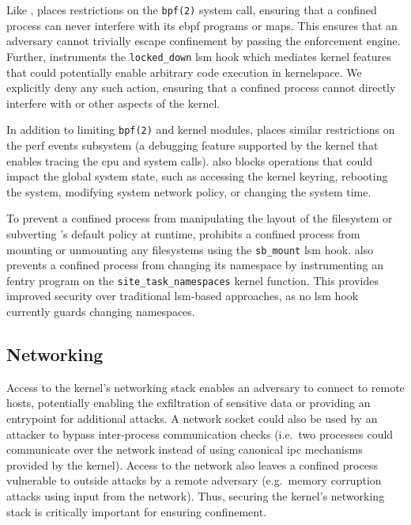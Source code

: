 Like \bpfbox{}, \bpfcontain{} places restrictions on the \texttt{bpf(2)} system call,
ensuring that a confined process can never interfere with its \gls{ebpf} programs or maps.
This ensures that an adversary cannot trivially escape confinement by passing the
enforcement engine. Further, \bpfcontain{} instruments the \texttt{locked\_down} \gls{lsm}
hook which mediates kernel features that could potentially enable arbitrary code execution
in kernelspace.  We explicitly deny any such action, ensuring that a confined process
cannot directly interfere with \bpfcontain{} or other aspects of the kernel.

In addition to limiting \texttt{bpf(2)} and kernel modules, \bpfcontain{} places similar
restrictions on the perf events subsystem (a debugging feature supported by the kernel
that enables tracing the \gls{cpu} and system calls). \bpfcontain{} also blocks operations
that could impact the global system state, such as accessing the kernel keyring, rebooting
the system, modifying system network policy, or changing the system time.

To prevent a confined process from manipulating the layout of the filesystem or subverting
\bpfcontain{}'s default policy at runtime, \bpfcontain{} prohibits a confined process from
mounting or unmounting any filesystems using the \texttt{sb\_mount} \gls{lsm} hook.
\bpfcontain{} also prevents a confined process from changing its namespace by
instrumenting an fentry program on the \texttt{site\_task\_namespaces} kernel function.
This provides improved security over traditional \gls{lsm}-based approaches, as no
\gls{lsm} hook currently guards changing namespaces.

\subsection{Networking}

Access to the kernel's networking stack enables an adversary to connect to remote hosts,
potentially enabling the exfiltration of sensitive data or providing an entrypoint for
additional attacks. A network socket could also be used by an attacker to bypass
inter-process communication checks (i.e.~two processes could communicate over the network
instead of using canonical \gls{ipc} mechanisms provided by the kernel). Access to the
network also leaves a confined process vulnerable to outside attacks by a remote adversary
(e.g.~memory corruption attacks using input from the network). Thus, securing the kernel's
networking stack is critically important for ensuring confinement.

